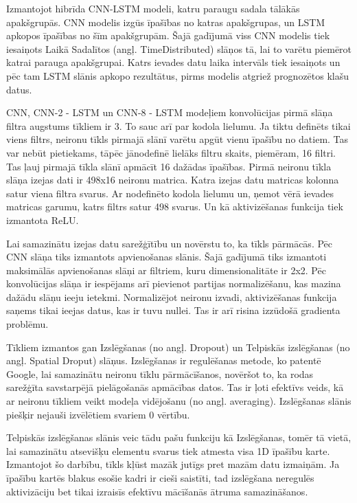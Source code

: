 \documentclass[12pt,paper=A4]{report}
\begin{document}
Izmantojot hibrīda CNN-LSTM modeli, katru paraugu sadala tālākās apakšgrupās. CNN modelis izgūs īpašības no katras apakšgrupas, un LSTM apkopos īpašības no šīm apakšgrupām. Šajā gadījumā viss CNN modelis tiek iesaiņots Laikā Sadalītos (angļ. TimeDistributed) slāņos tā, lai to varētu piemērot katrai parauga apakšgrupai. Katrs ievades datu laika intervāls tiek iesaiņots un pēc tam LSTM slānis apkopo rezultātus, pirms modelis atgriež prognozētos klašu datus.

CNN, CNN-2 - LSTM un CNN-8 - LSTM modeļiem konvolūcijas pirmā slāņa filtra augstums tīkliem ir 3. To sauc arī par kodola lielumu. Ja tiktu definēts tikai viens filtrs, neironu tīkls pirmajā slānī varētu apgūt vienu īpašību no datiem. Tas var nebūt pietiekams, tāpēc jānodefinē lielāks filtru skaits, piemēram, 16 filtri. Tas ļauj  pirmajā tīkla slānī apmācīt 16 dažādas īpašības. Pirmā neironu tīkla slāņa izejas dati ir 498x16 neironu matrica. Katra izejas datu matricas kolonna satur viena filtra svarus. Ar nodefinēto kodola lielumu un, ņemot vērā ievades matricas garumu, katrs filtrs satur 498 svarus. Un kā aktivizēšanas funkcija tiek izmantota ReLU.

Lai samazinātu izejas datu sarežģītību un novērstu to, ka tīkls pārmācās. Pēc CNN slāņa tiks izmantots apvienošanas slānis. Šajā gadījumā tiks izmantoti maksimālās apvienošanas slāņi ar filtriem, kuru dimensionalitāte ir 2x2. Pēc konvolūcijas slāņa ir iespējams arī pievienot partijas normalizēšanu, kas mazina dažādu slāņu ieeju ietekmi. Normalizējot neironu izvadi, aktivizēšanas funkcija saņems tikai ieejas datus, kas ir tuvu nullei. Tas ir arī risina izzūdošā gradienta problēmu.  

Tīkliem izmantos gan Izslēgšanas (no angļ. Dropout) un Telpiskās izslēgšanas (no angļ. Spatial Droput) slāņus. Izslēgšanas ir regulēšanas metode, ko patentē Google, lai samazinātu neironu tīklu pārmācīšanos, novēršot to, ka rodas sarežģīta savstarpējā pielāgošanās apmācības datos. Tas ir ļoti efektīvs veids, kā ar neironu tīkliem veikt modeļa vidējošanu (no angļ. averaging). Izslēgšanas slānis piešķir nejauši izvēlētiem svariem 0 vērtību. 

Telpiskās izslēgšanas slānis veic tādu pašu funkciju kā Izslēgšanas, tomēr tā vietā, lai samazinātu atsevišķu elementu svarus tiek atmesta visa 1D īpašību karte. Izmantojot šo darbību, tīkls kļūst mazāk jutīgs pret mazām datu izmaiņām. Ja īpašību kartēs blakus esošie kadri ir cieši saistīti, tad izslēgšana neregulēs aktivizāciju bet tikai izraisīs efektīvu mācīšanās ātruma samazināšanos.
\end{document}
